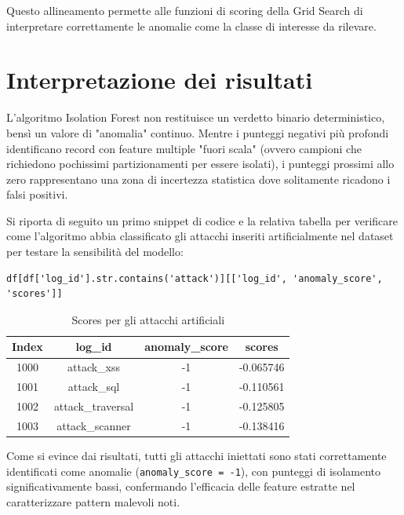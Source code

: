 Questo allineamento permette alle funzioni di scoring della Grid Search di interpretare correttamente le anomalie come la classe di interesse da rilevare.

\section{Interpretazione dei risultati}

L'algoritmo Isolation Forest non restituisce un verdetto binario deterministico, bensì un valore di "anomalia" continuo. Mentre i punteggi negativi più profondi identificano record con feature multiple "fuori scala" (ovvero campioni che richiedono pochissimi partizionamenti per essere isolati), i punteggi prossimi allo zero rappresentano una zona di incertezza statistica dove solitamente ricadono i falsi positivi.

Si riporta di seguito un primo snippet di codice e la relativa tabella per verificare come l'algoritmo abbia classificato gli attacchi inseriti artificialmente nel dataset per testare la sensibilità del modello:

\begin{lstlisting}[style=MatlabStyle, caption={Verifica classificazione attacchi artificiali}, label={lst:interpretazione}]
df[df['log_id'].str.contains('attack')][['log_id', 'anomaly_score', 'scores']]
\end{lstlisting}

\begin{table}[H]
      \centering
      \begin{tabular}{|c|c|c|c|}
            \hline
            Index & log\_id           & anomaly\_score & scores    \\
            \hline
            1000  & attack\_xss       & -1             & -0.065746 \\
            1001  & attack\_sql       & -1             & -0.110561 \\
            1002  & attack\_traversal & -1             & -0.125805 \\
            1003  & attack\_scanner   & -1             & -0.138416 \\
            \hline
      \end{tabular}
      \caption{Scores per gli attacchi artificiali}
\end{table}


Come si evince dai risultati, tutti gli attacchi iniettati sono stati correttamente identificati come anomalie (\texttt{anomaly\_score = -1}), con punteggi di isolamento significativamente bassi, confermando l'efficacia delle feature estratte nel caratterizzare pattern malevoli noti.

